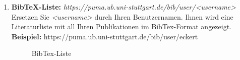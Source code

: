 \begin{description}
\begin{enumerate}
    \item \textbf{BibTeX-Liste:}\newline
    \textit{https://puma.ub.uni-stuttgart.de/bib/user/<username>} \newline
    Ersetzen Sie \textit{<username>} durch Ihren Benutzernamen. Ihnen wird eine Literaturliste mit all Ihren Publikationen im BibTex-Format angezeigt.\newline
    \textbf{Beispiel:} https://puma.ub.uni-stuttgart.de/bib/user/eckert 

\begin{figure}[h!]
 \centering
 \caption{BibTex-Liste}
 \label{figure038}
\end{figure}

\end{enumerate}

\end{description}
